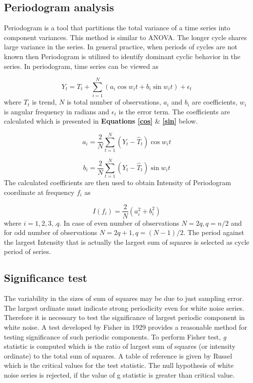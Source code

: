 \subsection{Periodogram analysis}

Periodogram is a tool that partitions the total variance of a time series into component variances. This method is similar to ANOVA. The longer cycle shares large variance in the series. In general practice, when periods of cycles are not known then Periodogram is utilized to identify dominant cyclic behavior in the series. In periodogram, time series can be viewed as

\begin{equation}
	Y_t = T_t + \sum_{i=1}^{N} (a_i \cos w_i t + b_i \sin w_i t) + \epsilon_t
\end{equation}
where $T_t$ is trend, $N$ is total number of observations, $a_i$ and $b_i$ are coefficients, $w_i$ is angular frequency in radians and $\epsilon_t$ is the error term. The coefficients are calculated which is presented in \textbf{Equations \ref{cos}} \& \textbf{\ref{sin}} below.

\begin{equation} \label{cos}
	a_i = \frac{2}{N} \sum_{t=1}^{N}(Y_t - \hat{T}_t) \cos w_i t
\end{equation}

\begin{equation} \label{sin}
b_i = \frac{2}{N} \sum_{t=1}^{N}(Y_t - \hat{T}_t) \sin w_i t
\end{equation}
The calculated coefficients are then used to obtain Intensity of Periodogram coordinate at frequency $f_i$ as

\begin{equation}
	I(f_i) = \frac{2}{N}(a_i^2 + b_i^2)
\end{equation}
where $i = 1,2,3,.q$. In case of even number of observations $N = 2q, q = n/2$ and for odd number of observations $N = 2q+1, q = (N-1)/2$. The period against the largest Intensity that is actually the largest sum
of squares is selected as cycle period of series.

\subsection{Significance test}
The variability in the sizes of sum of squares may be due to just sampling error. The largest
ordinate must indicate strong periodicity even for white noise series. Therefore it is necessary
to test the significance of largest periodic component in white noise. A test developed by Fisher in 1929 \cite{fisher1929tests} provides a reasonable method for testing significance of such periodic components. To perform Fisher test, \textit{g} statistic is computed which is the ratio of largest sum of squares (or intensity ordinate) to the total sum of squares. A table of reference is given by Russel \cite{russel1985significance} which is the critical values for the test statistic. The null hypothesis of white noise series is rejected, if
the value of g statistic is greater than critical value.

